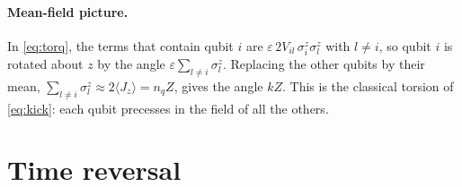 \documentclass[11pt,a4paper]{article}
\begin{document}
\paragraph{Mean-field picture.}
In \cref{eq:torq}, the terms that contain qubit $i$ are $\varepsilon\,2V_{il}\,\sigma^z_i\sigma^z_l$ with $l\ne i$, so qubit
$i$ is rotated about $z$ by the angle $\varepsilon\sum_{l\ne i}\sigma^z_l$. Replacing the other qubits by their mean,
$\sum_{l\ne i}\sigma^z_l\approx 2\langle J_z\rangle = n_qZ$, gives the angle $kZ$. This is the classical torsion of
\cref{eq:kick}: each qubit precesses in the field of all the others.

\section{Time reversal}\label{sec:reversal}
\end{document}
